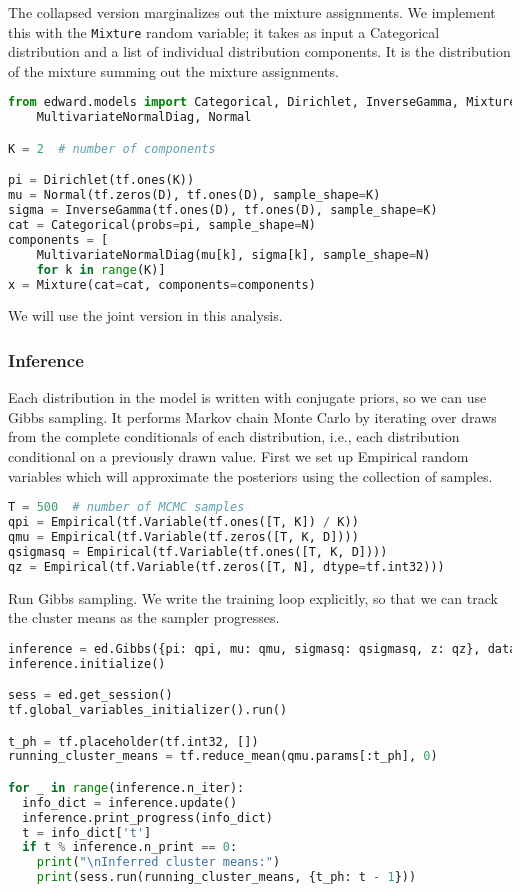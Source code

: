 The collapsed version marginalizes out the mixture assignments. We
implement this with the \texttt{Mixture} random variable; it takes as
input a Categorical distribution and a list of individual distribution
components. It is the distribution of the mixture summing out the
mixture assignments.

\begin{lstlisting}[language=Python]
from edward.models import Categorical, Dirichlet, InverseGamma, Mixture, \
    MultivariateNormalDiag, Normal

K = 2  # number of components

pi = Dirichlet(tf.ones(K))
mu = Normal(tf.zeros(D), tf.ones(D), sample_shape=K)
sigma = InverseGamma(tf.ones(D), tf.ones(D), sample_shape=K)
cat = Categorical(probs=pi, sample_shape=N)
components = [
    MultivariateNormalDiag(mu[k], sigma[k], sample_shape=N)
    for k in range(K)]
x = Mixture(cat=cat, components=components)
\end{lstlisting}

We will use the joint version in this analysis.

\subsubsection{Inference}

Each distribution in the model is written with conjugate priors, so we
can use Gibbs sampling. It performs Markov chain Monte Carlo by
iterating over draws from the complete conditionals of each
distribution, i.e., each distribution conditional on a previously
drawn value. First we set up Empirical random variables which will
approximate the posteriors using the collection of samples.

\begin{lstlisting}[language=Python]
T = 500  # number of MCMC samples
qpi = Empirical(tf.Variable(tf.ones([T, K]) / K))
qmu = Empirical(tf.Variable(tf.zeros([T, K, D])))
qsigmasq = Empirical(tf.Variable(tf.ones([T, K, D])))
qz = Empirical(tf.Variable(tf.zeros([T, N], dtype=tf.int32)))
\end{lstlisting}

Run Gibbs sampling. We write the training loop explicitly, so that we can track
the cluster means as the sampler progresses.
\begin{lstlisting}[language=Python]
inference = ed.Gibbs({pi: qpi, mu: qmu, sigmasq: qsigmasq, z: qz}, data={x: x_train})
inference.initialize()

sess = ed.get_session()
tf.global_variables_initializer().run()

t_ph = tf.placeholder(tf.int32, [])
running_cluster_means = tf.reduce_mean(qmu.params[:t_ph], 0)

for _ in range(inference.n_iter):
  info_dict = inference.update()
  inference.print_progress(info_dict)
  t = info_dict['t']
  if t % inference.n_print == 0:
    print("\nInferred cluster means:")
    print(sess.run(running_cluster_means, {t_ph: t - 1}))
\end{lstlisting}

